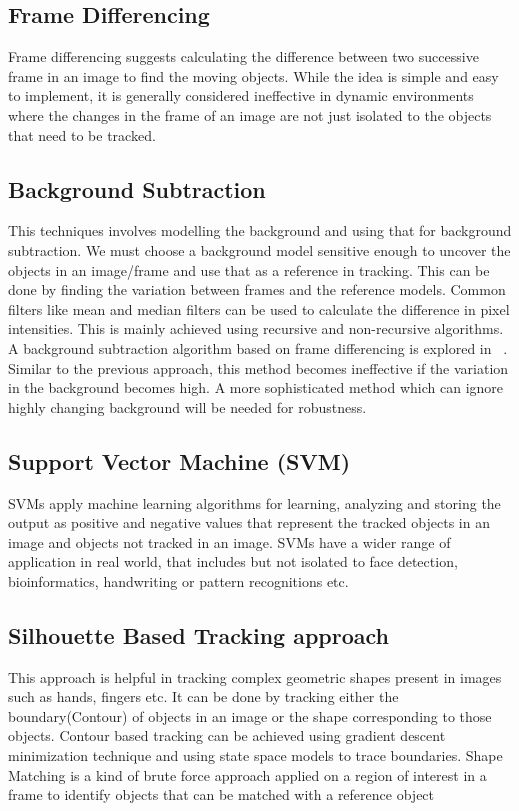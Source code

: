 \documentclass[10pt,twocolumn,letterpaper]{article}
\begin{document}

\subsection{Frame Differencing}
Frame differencing suggests calculating the difference between two successive frame in an image to find the moving objects. While the idea is simple and easy to implement, it is generally considered ineffective in dynamic environments where the changes in the frame of an image are not just isolated to the objects that need to be tracked.

\subsection{Background Subtraction}
This techniques involves modelling the background and using that for background subtraction. We must choose a background model sensitive enough to uncover the objects in an image/frame and use that as a reference in tracking. This can be done by finding the variation between frames and the reference models. Common filters like mean and median filters can be used to calculate the difference in pixel intensities. This is mainly achieved using recursive and non-recursive algorithms. A background subtraction algorithm based on frame differencing is explored in ~\cite{literaturereview}.  Similar to the previous approach, this method becomes ineffective if the variation in the background becomes high. A more sophisticated method which can ignore highly changing  background will be needed for robustness.

\subsection{Support Vector Machine (SVM)}
SVMs apply machine learning algorithms for learning, analyzing and storing the output as positive and negative values that represent the tracked objects in an image and objects not tracked in an image. SVMs have a wider range of application in real world, that includes but not isolated to face detection, bioinformatics, handwriting or pattern recognitions etc.

\subsection{Silhouette Based Tracking approach}
This approach is helpful in tracking complex geometric shapes present in images such as hands, fingers etc. It can be done by tracking either the boundary(Contour) of objects in an image or the shape corresponding to those objects. Contour based tracking can be achieved using gradient descent minimization technique and using state space models to trace boundaries. Shape Matching is a kind of brute force approach applied on a region of interest in a frame to identify objects that can be matched with a reference object
\end{document}
